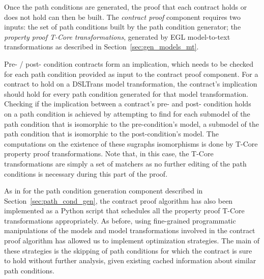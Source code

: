 Once the path conditions are generated, the proof that each
contract holds or does not hold can then be built. The \emph{contract proof}
component requires two inputs: the set of path conditions built by the path condition generator;
the \emph{property proof T-Core transformations}, generated by EGL model-to-text
transformations as described in Section~\ref{sec:gen_models_mt}. 

Pre- / post- condition contracts form an implication, which needs to be
checked for each path condition provided as input to the contract proof
component. For a contract to hold on a DSLTrans model transformation, the
contract's implication should hold for every path condition generated for
that model transformation. Checking if the implication between a contract's pre-
and post- condition holds on a path condition is achieved by attempting to find for each submodel of
the path condition that is isomorphic to the pre-condition's model, a submodel
of the path condition that is isomorphic to the post-condition's model. The
computations on the existence of these sugraphs isomorphisms is done by T-Core
property proof transformations. Note that, in this case, the T-Core
transformations are simply a set of matchers as no further editing of the path
conditions is necessary during this part of the proof.

As in for the path condition generation component described in
Section~\ref{sec:path_cond_gen}, the contract proof algorithm has also been
implemented as a Python script that schedules all the property proof T-Core
transformations appropriately. As before, using fine-grained programmatic
manipulations of the models and model transformations involved in the contract
proof algorithm has allowed us to implement optimization strategies. The main
of these strategies is the skipping of path conditions for which the contract
is sure to hold without further analysis, given existing cached information
about similar path conditions.


